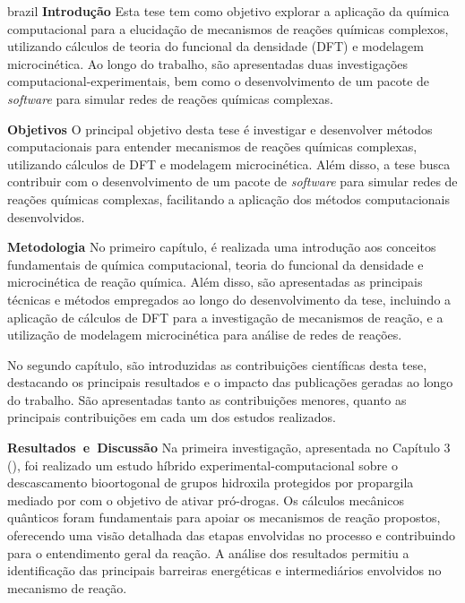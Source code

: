 \begin{resumo}
	\begin{otherlanguage*}{brazil}
		\textbf{Introdução}\linebreak
		Esta tese tem como objetivo explorar a aplicação da química computacional para a elucidação de mecanismos de reações químicas complexos,
		utilizando cálculos de teoria do funcional da densidade (DFT) e modelagem microcinética.
		Ao longo do trabalho,
		são apresentadas duas investigações computacional-experimentais,
		bem como o desenvolvimento de um pacote de \emph{software} para simular redes de reações químicas complexas.

		\textbf{Objetivos}\linebreak
		O principal objetivo desta tese é investigar e desenvolver métodos computacionais para entender mecanismos de reações químicas complexas,
		utilizando cálculos de DFT e modelagem microcinética.
		Além disso,
		a tese busca contribuir com o desenvolvimento de um pacote de \emph{software} para simular redes de reações químicas complexas,
		facilitando a aplicação dos métodos computacionais desenvolvidos.

		\textbf{Metodologia}\linebreak
		No primeiro capítulo,
		é realizada uma introdução aos conceitos fundamentais de química computacional,
		teoria do funcional da densidade e microcinética de reação química.
		Além disso,
		são apresentadas as principais técnicas e métodos empregados ao longo do desenvolvimento da tese,
		incluindo a aplicação de cálculos de DFT para a investigação de mecanismos de reação,
		e a utilização de modelagem microcinética para análise de redes de reações.

		No segundo capítulo,
		são introduzidas as contribuições científicas desta tese,
		destacando os principais resultados e o impacto das publicações geradas ao longo do trabalho.
		São apresentadas tanto as contribuições menores,
		quanto as principais contribuições em cada um dos estudos realizados.

		\mbox{\textbf{Resultados~e~Discussão}}\linebreak
		Na primeira investigação,
		apresentada no Capítulo 3 (),
		foi realizado um estudo híbrido experimental-computacional sobre o descascamento bioortogonal de grupos hidroxila protegidos por propargila mediado por  com o objetivo de ativar pró-drogas.
		Os cálculos mecânicos quânticos foram fundamentais para apoiar os mecanismos de reação propostos,
		oferecendo uma visão detalhada das etapas envolvidas no processo e contribuindo para o entendimento geral da reação.
		A análise dos resultados permitiu a identificação das principais barreiras energéticas e intermediários envolvidos no mecanismo de reação.


\end{otherlanguage*}
\end{resumo}
